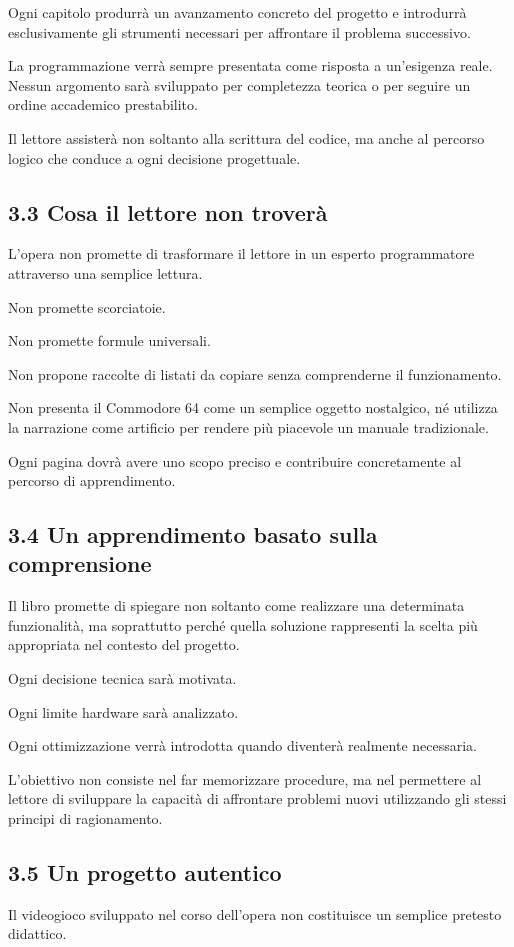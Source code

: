 \documentclass{article}
\begin{document}
Ogni capitolo produrrà un avanzamento concreto del progetto e introdurrà esclusivamente gli strumenti necessari per
affrontare il problema successivo.

La programmazione verrà sempre presentata come risposta a un'esigenza reale. Nessun argomento sarà sviluppato per
completezza teorica o per seguire un ordine accademico prestabilito.

Il lettore assisterà non soltanto alla scrittura del codice, ma anche al percorso logico che conduce a ogni decisione
progettuale.

\subsection{3.3 Cosa il lettore non troverà}
L'opera non promette di trasformare il lettore in un esperto programmatore attraverso una semplice lettura.

Non promette scorciatoie.

Non promette formule universali.

Non propone raccolte di listati da copiare senza comprenderne il funzionamento.

Non presenta il Commodore 64 come un semplice oggetto nostalgico, né utilizza la narrazione come artificio per rendere
più piacevole un manuale tradizionale.

Ogni pagina dovrà avere uno scopo preciso e contribuire concretamente al percorso di apprendimento.

\subsection{3.4 Un apprendimento basato sulla comprensione}
Il libro promette di spiegare non soltanto come realizzare una determinata funzionalità, ma soprattutto perché quella
soluzione rappresenti la scelta più appropriata nel contesto del progetto.

Ogni decisione tecnica sarà motivata.

Ogni limite hardware sarà analizzato.

Ogni ottimizzazione verrà introdotta quando diventerà realmente necessaria.

L'obiettivo non consiste nel far memorizzare procedure, ma nel permettere al lettore di sviluppare la capacità di
affrontare problemi nuovi utilizzando gli stessi principi di ragionamento.

\subsection{3.5 Un progetto autentico}
Il videogioco sviluppato nel corso dell'opera non costituisce un semplice pretesto didattico.
\end{document}
